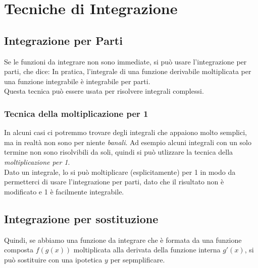 \documentclass[12pt, a4paper, openany]{book}
\begin{document}
	\section{Tecniche di Integrazione}

	\subsection{Integrazione per Parti}
	Se le funzioni da integrare non sono immediate, si può usare l'integrazione per parti, che dice:
	In pratica, l'integrale di una funzione derivabile moltiplicata per una funzione integrabile è integrabile per parti.
	\\Questa tecnica può essere usata per risolvere integrali complessi.
	\subsubsection*{Tecnica della moltiplicazione per 1}
	In alcuni casi ci potremmo trovare degli integrali che appaiono molto semplici, ma in realtà non sono per niente \emph{banali}.
	Ad esempio alcuni integrali con un solo termine non sono risolvibili da soli, quindi si può utlizzare la tecnica della \emph{moltiplicazione per 1}.
	\\Dato un integrale, lo si può moltiplicare (esplicitamente) per 1 in modo da permetterci di usare l'integrazione per parti, dato che il risultato non è modificato e 1 è facilmente integrabile.


	\subsection{Integrazione per sostituzione}
	Quindi, se abbiamo una funzione da integrare che è formata da una funzione composta $f(g(x))$ moltiplicata alla derivata della funzione interna $g'(x)$,
	si può sostituire con una ipotetica $y$ per sepmplificare.
\end{document}
